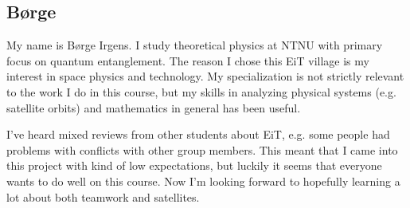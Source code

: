 \subsection{Børge}

My name is Børge Irgens. I study theoretical physics at NTNU with primary focus on quantum entanglement. The reason I chose this EiT village is my interest in space physics and technology. My specialization is not strictly relevant to the work I do in this course, but my skills in analyzing physical systems (e.g. satellite orbits) and mathematics in general has been useful.

I've heard mixed reviews from other students about EiT, e.g. some people had problems with conflicts with other group members. This meant that I came into this project with kind of low expectations, but luckily it seems that everyone wants to do well on this course. Now I'm looking forward to hopefully learning a lot about both teamwork and satellites.
